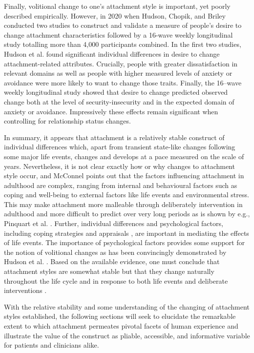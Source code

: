 \documentclass[12pt]{report}
\begin{document}
Finally, volitional change to one's attachment style is important, yet poorly described empirically.
However, in 2020 when Hudson, Chopik, and Briley \citeyear{Hudson2020} conducted two studies to construct and validate a measure of people's desire to change attachment characteristics followed by a 16-wave weekly longitudinal study totalling more than 4,000 participants combined.
In the first two studies, Hudson et al. found significant individual differences in desire to change attachment-related attributes.
Crucially, people with greater dissatisfaction in relevant domains as well as people with higher measured levels of anxiety or avoidance were more likely to want to change those traits.
Finally, the 16–wave weekly longitudinal study showed that desire to change predicted observed change both at the level of security-insecurity and in the expected domain of anxiety or avoidance.
Impressively these effects remain significant when controlling for relationship status changes.

In summary, it appears that attachment is a relatively stable construct of individual differences which, apart from transient state-like changes following some major life events, changes and develops at a pace measured on the scale of years.
Nevertheless, it is not clear exactly how or why changes to attachment style occur, and McConnel \citeyear{McConnell2011} points out that the factors influencing attachment in adulthood are complex, ranging from internal and behavioural factors such as coping and well-being to external factors like life events and environmental stress.
This may make attachment more malleable through deliberately intervention in adulthood and more difficult to predict over very long periods as is shown by e.g., Pinquart et al. \citeyear{Pinquart2013}.
Further, individual differences and psychological factors, including coping strategies \cite{Zhang2004} and appraisals \cite{Fraley2021}, are important in mediating the effects of life events. The importance of psychological factors provides some support for the notion of volitional changes as has been convincingly demonstrated by Hudson et al. \citeyear{Hudson2020}.
Based on the available evidence, one must conclude that attachment styles are somewhat stable but that they change naturally throughout the life cycle \cite{Rowe2005,Doherty2004,Fraley1997} and in response to both life events \cite{Fraley2021} and deliberate interventions \cite{Hudson2020}.

With the relative stability and some understanding of the changing of attachment styles established, the following sections will seek to elucidate the remarkable extent to which attachment permeates pivotal facets of human experience and illustrate the value of the construct as pliable, accessible, and informative variable for patients and clinicians alike.
\end{document}
